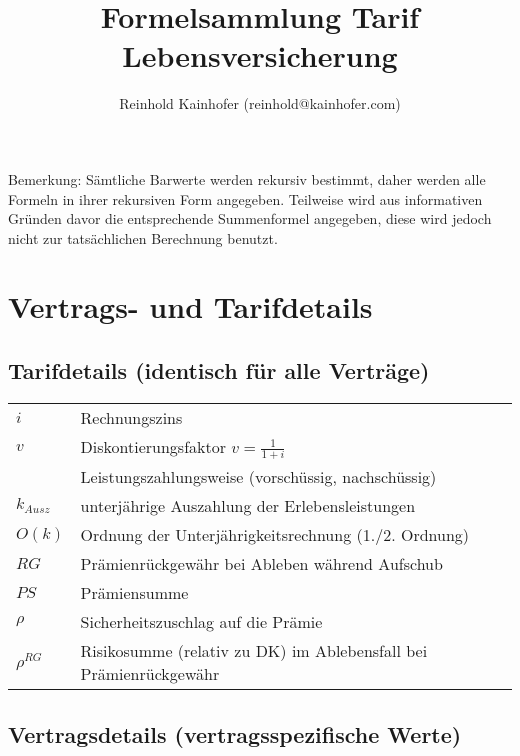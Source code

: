 \documentclass[a4paper,10pt]{article}
\title{\textbf{Formelsammlung Tarif Lebensversicherung}}
\author{Reinhold Kainhofer (reinhold@kainhofer.com)}
\begin{document}
\maketitle

% 

Bemerkung: Sämtliche Barwerte werden rekursiv bestimmt, daher werden alle Formeln in ihrer rekursiven Form angegeben. Teilweise wird aus informativen Gründen davor die entsprechende Summenformel angegeben, diese wird jedoch nicht zur tatsächlichen Berechnung benutzt. 


\section{Vertrags- und Tarifdetails}

\subsection{Tarifdetails (identisch für alle Verträge)}
\begin{longtable}{p{1cm}p{10cm}}
 $i$ & Rechnungszins\\[0.5em]
 $v$ & Diskontierungsfaktor $v=\frac1{1+i}$\\[0.5em]
 
 ${}$ & Leistungszahlungsweise (vorschüssig, nachschüssig)\\
 $k_{Ausz}$ & unterjährige Auszahlung der Erlebensleistungen\\
 $O(k)$ & Ordnung der Unterjährigkeitsrechnung (1./2. Ordnung)\\[0.5em]
 
 $RG$ & Prämienrückgewähr bei Ableben während Aufschub\\
 $PS$ & Prämiensumme \\
 
 $\rho$ & Sicherheitszuschlag auf die Prämie \\
 $\rho^{RG}$ & Risikosumme (relativ zu DK) im Ablebensfall bei Prämienrückgewähr \\
 
\end{longtable}


\subsection{Vertragsdetails (vertragsspezifische Werte)}
\end{document}
